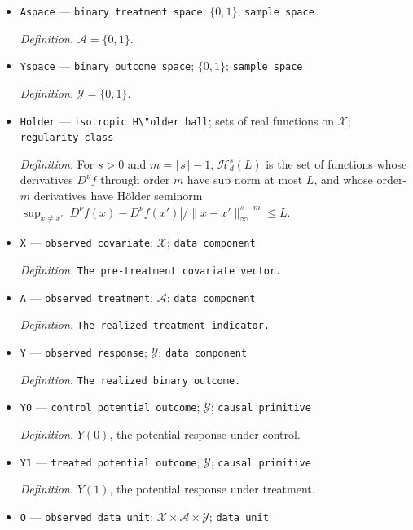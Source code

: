 \documentclass{article}
\begin{document}
\begin{itemize}
  \par\smallskip\noindent\emph{Definition.} \(\mathcal X=[0,1]^d\).
  \item \texttt{Aspace} --- \texttt{binary treatment space}; \(\{0,1\}\); \texttt{sample space}
  \par\smallskip\noindent\emph{Definition.} \(\mathcal A=\{0,1\}\).
  \item \texttt{Yspace} --- \texttt{binary outcome space}; \(\{0,1\}\); \texttt{sample space}
  \par\smallskip\noindent\emph{Definition.} \(\mathcal Y=\{0,1\}\).
  \item \texttt{Holder} --- \texttt{isotropic H\textbackslash{}\allowbreak{}"older ball}; sets of real functions on \(\mathcal X\); \texttt{regularity class}
  \par\smallskip\noindent\emph{Definition.} For \(s>0\) and \(m=\lceil s\rceil-1\), \(\mathcal H_d^s(L)\) is the set of functions whose derivatives \(D^\nu f\) through order \(m\) have sup norm at most \(L\), and whose order-\(m\) derivatives have H\"older seminorm \(\sup_{x\ne x'}|D^\nu f(x)-D^\nu f(x')|/\lVert x-x'\rVert_\infty^{s-m}\le L\).
  \item \texttt{X} --- \texttt{observed covariate}; \(\mathcal X\); \texttt{data component}
  \par\smallskip\noindent\emph{Definition.} \texttt{The pre-\allowbreak{}treatment covariate vector.}
  \item \texttt{A} --- \texttt{observed treatment}; \(\mathcal A\); \texttt{data component}
  \par\smallskip\noindent\emph{Definition.} \texttt{The realized treatment indicator.}
  \item \texttt{Y} --- \texttt{observed response}; \(\mathcal Y\); \texttt{data component}
  \par\smallskip\noindent\emph{Definition.} \texttt{The realized binary outcome.}
  \item \texttt{Y0} --- \texttt{control potential outcome}; \(\mathcal Y\); \texttt{causal primitive}
  \par\smallskip\noindent\emph{Definition.} \(Y(0)\), the potential response under control.
  \item \texttt{Y1} --- \texttt{treated potential outcome}; \(\mathcal Y\); \texttt{causal primitive}
  \par\smallskip\noindent\emph{Definition.} \(Y(1)\), the potential response under treatment.
  \item \texttt{O} --- \texttt{observed data unit}; \(\mathcal X\times\mathcal A\times\mathcal Y\); \texttt{data unit}

\end{itemize}
\end{document}
